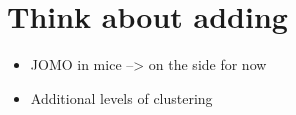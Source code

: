 \documentclass[
]{jss}
\begin{document}
\hypertarget{think-about-adding}{%
\section{Think about adding}\label{think-about-adding}}

\begin{itemize}
\item
  JOMO in mice --\textgreater{} on the side for now
\item
  Additional levels of clustering
\end{itemize}

\renewcommand\refname{References}

\end{document}
